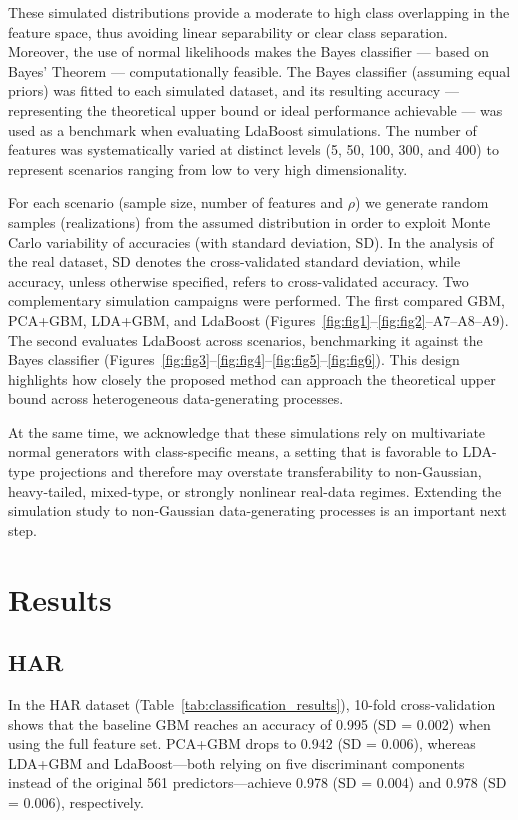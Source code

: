 \documentclass[11pt,a4paper]{article}
\begin{document}
These simulated distributions provide a moderate to high class overlapping in the feature space, thus avoiding linear separability or clear class separation. Moreover, the use of normal likelihoods makes the Bayes classifier — based on Bayes' Theorem — computationally feasible. The Bayes classifier (assuming equal priors) was fitted to each simulated dataset, and its resulting accuracy — representing the theoretical upper bound or ideal performance achievable — was used as a benchmark when evaluating LdaBoost simulations.
The number of features was systematically varied at distinct levels (5, 50, 100, 300, and 400) to represent scenarios ranging from low to very high dimensionality. 

For each scenario (sample size, number of features and $\rho$) we generate random samples (realizations) from the assumed distribution in order to exploit Monte Carlo variability of accuracies (with standard deviation, SD). 
In the analysis of the real dataset, SD denotes the cross-validated standard deviation, while accuracy, unless otherwise specified, refers to cross-validated accuracy.
Two complementary simulation campaigns were performed. The first compared GBM, PCA+GBM, LDA+GBM, and LdaBoost (Figures~\ref{fig:fig1}--\ref{fig:fig2}--A7--A8--A9). 
The second evaluates LdaBoost across scenarios, benchmarking it against the Bayes classifier (Figures~\ref{fig:fig3}--\ref{fig:fig4}--\ref{fig:fig5}--\ref{fig:fig6}). This design highlights how closely the proposed method can approach the theoretical upper bound across heterogeneous data-generating processes.

At the same time, we acknowledge that these simulations rely on multivariate normal generators with class-specific means, a setting that is favorable to LDA-type projections and therefore may overstate transferability to non-Gaussian, heavy-tailed, mixed-type, or strongly nonlinear real-data regimes. Extending the simulation study to non-Gaussian data-generating processes is an important next step.

\section*{Results}
\subsection*{HAR}
In the HAR dataset (Table~\ref{tab:classification_results}), 10-fold cross-validation shows that the baseline GBM reaches an accuracy of 0.995 (SD = 0.002) when using the full feature set. PCA+GBM drops to 0.942 (SD = 0.006), whereas LDA+GBM and LdaBoost---both relying on five discriminant components instead of the original 561 predictors---achieve 0.978 (SD = 0.004) and 0.978 (SD = 0.006), respectively.
\end{document}
